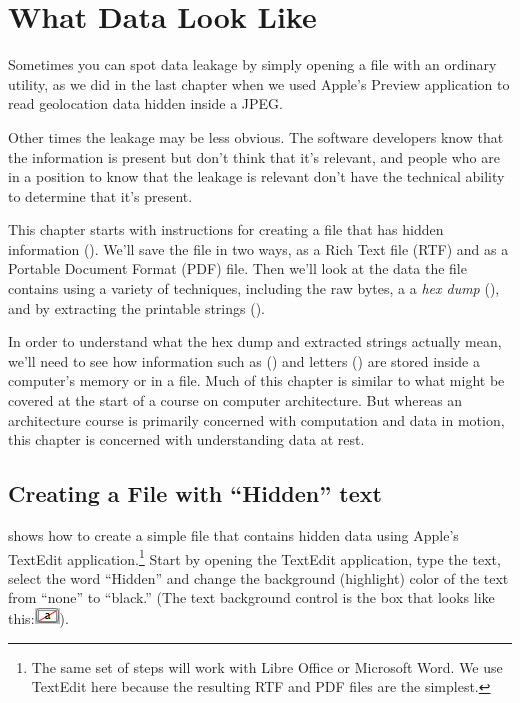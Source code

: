 \chapter{What Data Look Like \IN}

Sometimes you can spot data leakage by simply opening a file with an
ordinary utility, as we did in the last chapter when we used Apple's
Preview application to read geolocation data hidden inside a JPEG. 

Other times the leakage may be less obvious.  The software developers
know that the information is present but don't think that it's
relevant, and people who are in a position to know that the leakage is
relevant don't have the technical ability to determine that it's
present.

This chapter starts with instructions for creating a file that has hidden information
(). We'll save the file in two ways, as a Rich
Text file (RTF) and as a Portable Document Format (PDF) file. Then
we'll look at the data the file contains using a variety of
techniques, including the raw bytes, a a \emph{hex dump}
(), and by extracting the printable strings
(). 

In order to understand what the hex dump and extracted strings
actually mean, we'll need to see how information such as 
() and letters () are 
stored inside a computer's memory or in a file.  Much of this chapter is similar to
what might be covered at the start of a course on computer
architecture. But whereas an architecture course is primarily
concerned with computation and data in motion, this chapter is
concerned with understanding data at rest.

\section{Creating a File with ``Hidden'' text}\label{sec:make-pdf}

 shows how to create a simple file that
contains hidden data using Apple's TextEdit application.\footnote{The
  same set of steps will work with Libre Office or Microsoft Word. We
  use TextEdit here because the resulting RTF and PDF files are the
  simplest.}
 Start by
opening the TextEdit application, type the text, select the word ``Hidden'' and
change the background (highlight) color of the text from ``none'' to
``black.'' (The text background control is the box that looks like this:\includegraphics[height=1.5ex]{ch-what/textedit_highlight_control}).

